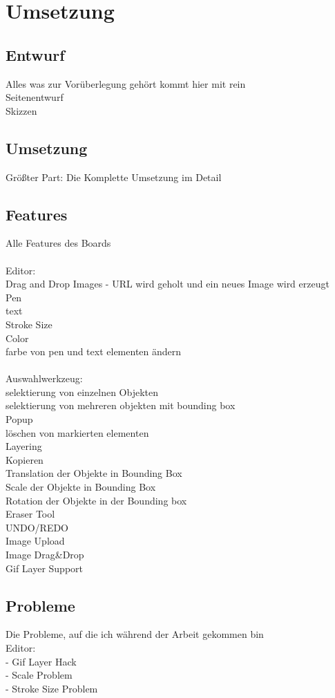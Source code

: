\chapter{Umsetzung}\label{Bauhausboard}
\section{Entwurf}\label{Entwurf}
Alles was zur Vorüberlegung gehört kommt hier mit rein\\
Seitenentwurf\\
Skizzen\\

\section{Umsetzung}\label{Umsetzung}
Größter Part: Die Komplette Umsetzung im Detail
\section{Features}\label{Features}
Alle Features des Boards\\
\\
Editor:\\
Drag and Drop Images - URL wird geholt und ein neues Image wird erzeugt\\
Pen\\
text\\
Stroke Size\\
Color\\
farbe von pen und text elementen ändern\\
\\
Auswahlwerkzeug:\\
selektierung von einzelnen Objekten\\
selektierung von mehreren objekten mit bounding box\\
Popup\\
löschen von markierten elementen\\
Layering\\
Kopieren\\
Translation der Objekte in Bounding Box\\
Scale der Objekte in Bounding Box\\
Rotation der Objekte in der Bounding box\\
Eraser Tool\\
UNDO/REDO\\
Image Upload\\
Image Drag&Drop\\
Gif Layer Support\\


\section{Probleme}\label{Probleme}
Die Probleme, auf die ich während der Arbeit gekommen bin\\
Editor:\\
- Gif Layer Hack\\
- Scale Problem\\
- Stroke Size Problem\\
